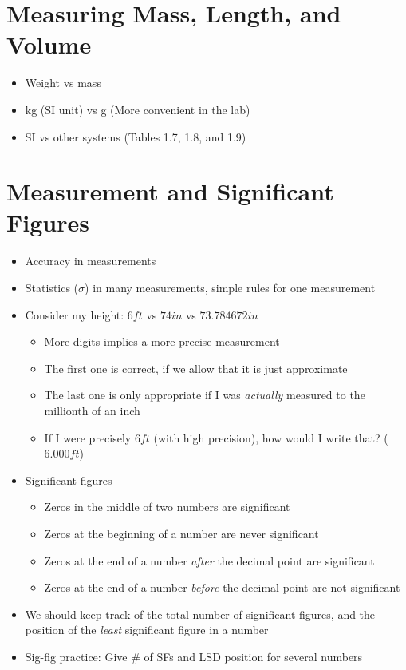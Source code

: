 \documentclass[12pt, openany, letterpaper]{memoir}
\begin{document}
\section{Measuring Mass, Length, and Volume}
\begin{itemize}
	\item Weight vs mass
	\item kg (SI unit) vs g (More convenient in the lab)
	\item SI vs other systems (Tables 1.7, 1.8, and 1.9)
\end{itemize}

\section{Measurement and Significant Figures}
\begin{itemize}
	\item Accuracy in measurements
	\item Statistics ($\sigma$) in many measurements, simple rules for one measurement
	\item Consider my height: $6ft$ vs $74in$ vs $73.784672in$
	\begin{itemize}
		\item More digits implies a more precise measurement
		\item The first one is correct, if we allow that it is just approximate
		\item The last one is only appropriate if I was \emph{actually} measured to the millionth of an inch
		\item If I were precisely $6ft$ (with high precision), how would I write that? ($6.000ft$)
	\end{itemize} 
	\item Significant figures
	\begin{itemize}
		\item Zeros in the middle of two numbers are significant
		\item Zeros at the beginning of a number are never significant
		\item Zeros at the end of a number \emph{after} the decimal point are significant
		\item Zeros at the end of a number \emph{before} the decimal point are not significant
	\end{itemize}	
	\item We should keep track of the total number of significant figures, and the position of the \emph{least} significant figure in a number
	\item Sig-fig practice: Give \# of SFs and LSD position for several numbers
\end{itemize}
\end{document}
